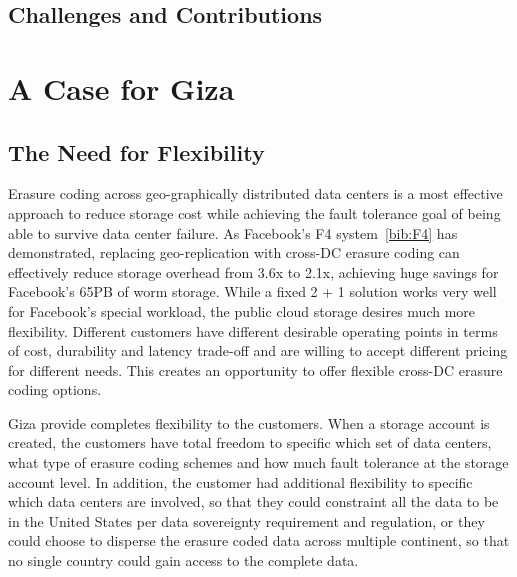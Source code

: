 \subsection{Challenges and Contributions}



\section{A Case for Giza}

\subsection{The Need for Flexibility}

Erasure coding across geo-graphically distributed data centers is a most effective approach to reduce storage cost while achieving the fault tolerance goal of being able to survive data center failure. As Facebook's F4 system~\ref{bib:F4} has demonstrated, replacing geo-replication with cross-DC erasure coding can effectively reduce storage overhead from 3.6x to 2.1x, achieving huge savings for Facebook's 65PB of worm storage. While a fixed 2 + 1 solution works very well for Facebook's special workload, the public cloud storage desires much more flexibility. Different customers have different desirable operating points in terms of cost, durability and latency trade-off and are willing to accept different pricing for different needs. This creates an opportunity to offer flexible cross-DC erasure coding options.

Giza provide completes flexibility to the customers. When a storage account is created, the customers have total freedom to specific which set of data centers, what type of erasure coding schemes and how much fault tolerance at the storage account level. In addition, the customer had additional flexibility to specific which data centers are involved, so that they could constraint all the data to be in the United States per data sovereignty requirement and regulation, or they could choose to disperse the erasure coded data across multiple continent, so that no single country could gain access to the complete data.

